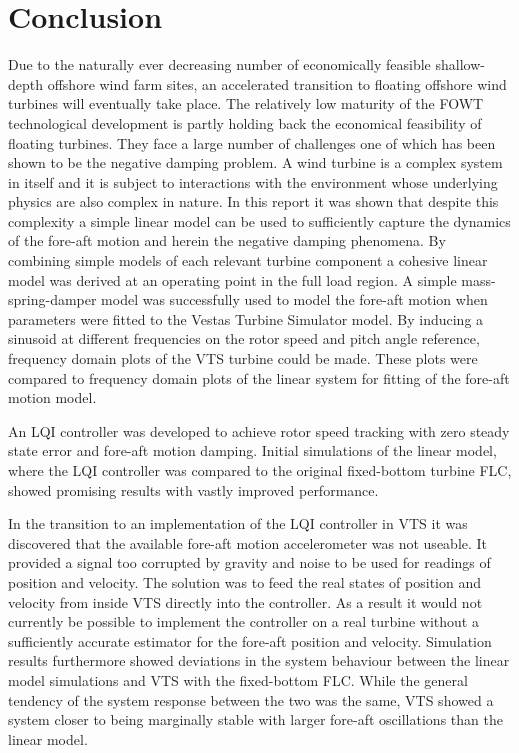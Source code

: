 \section{Conclusion} \label{sec:concl}
Due to the naturally ever decreasing number of economically feasible shallow-depth offshore wind farm sites, an accelerated transition to floating offshore wind turbines will eventually take place. The relatively low maturity of the FOWT technological development is partly holding back the economical feasibility of floating turbines. They face a large number of challenges one of which has been shown to be the negative damping problem. A wind turbine is a complex system in itself and it is subject to interactions with the environment whose underlying physics are also complex in nature. In this report it was shown that despite this complexity a simple linear model can be used to sufficiently capture the dynamics of the fore-aft motion and herein the negative damping phenomena. By combining simple models of each relevant turbine component a cohesive linear model was derived at an operating point in the full load region. A simple mass-spring-damper model was successfully used to model the fore-aft motion when parameters were fitted to the Vestas Turbine Simulator model. By inducing a sinusoid at different frequencies on the rotor speed and pitch angle reference, frequency domain plots of the VTS turbine could be made. These plots were compared to frequency domain plots of the linear system for fitting of the fore-aft motion model.

\smallskip
An LQI controller was developed to achieve rotor speed tracking with zero steady state error and fore-aft motion damping. Initial simulations of the linear model, where the LQI controller was compared to the original fixed-bottom turbine FLC, showed promising results with vastly improved performance.

In the transition to an implementation of the LQI controller in VTS it was discovered that the available fore-aft motion accelerometer was not useable. It provided a signal too corrupted by gravity and noise to be used for readings of position and velocity. The solution was to feed the real states of position and velocity from inside VTS directly into the controller. As a result it would not currently be possible to implement the controller on a real turbine without a sufficiently accurate estimator for the fore-aft position and velocity. Simulation results furthermore showed deviations in the system behaviour between the linear model simulations and VTS with the fixed-bottom FLC. While the general tendency of the system response between the two was the same, VTS showed a system closer to being marginally stable with larger fore-aft oscillations than the linear model.

